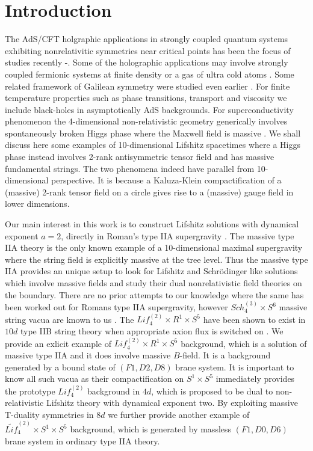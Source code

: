 \documentclass[12pt]{article}
\begin{document}
\section{Introduction}
The AdS/CFT  \cite{Maldacena:1997re,Gubser:1998bc, Witten:1998qj}
 holgraphic applications in strongly 
coupled quantum systems exhibiting nonrelativitic symmetries near critical points
 has been the focus of studies recently \cite{son}-\cite{taylor}.  
Some of the holographic applications may involve   strongly coupled fermionic 
systems at finite density or a gas of ultra cold atoms 
\cite{son, bala}. Some  related framework of Galilean symmetry were 
studied even earlier  \cite{horvathy}.  For 
finite temperature properties such as phase transitions, 
transport and viscosity we include black-holes in asymptotically 
AdS  backgrounds. For superconductivity phenomenon  the 4-dimensional
non-relativistic  geometry generically involves 
spontaneously broken Higgs phase where the  Maxwell field 
is massive \cite{herzogrev,denefrev}. We shall discuss here some 
examples of 10-dimensional Lifshitz spacetimes
 where a Higgs phase instead involves  2-rank 
antisymmetric tensor field and has massive fundamental strings. 
The two phenomena 
indeed have parallel from 10-dimensional perspective. It is because
a Kaluza-Klein compactification of a (massive) 2-rank tensor field
on a circle  gives rise to a (massive) gauge field in  lower dimensions.

Our main interest in this work is to construct Lifshitz  solutions with dynamical 
exponent $a=2$, directly in  Roman's  type IIA supergravity  \cite{roma}.
The massive type IIA theory is the only known example of a 
10-dimensional maximal supergravity where the string 
field is explicitly massive at the tree level. 
Thus the massive type IIA  provides an unique setup to look for Lifshitz  
and Schr\"odinger  like
 solutions which involve massive fields and study  their dual
nonrelativistic field theories on the boundary.
There are no prior
attempts to our knowledge where the same has been worked out for 
Romans type IIA supergravity, however $Sch_4^{(3)}\times S^6$ massive string
vacua are known to us \cite{Singh:2009tq}. 
The $Lif_4^{(2)}\times R^1\times S^5$ have been shown to exist 
in $10d$ type IIB
string theory when appropriate axion flux is switched 
on \cite{Balasubramanian:2010uk}. We provide an exlicit example of 
$Lif_4^{(2)}\times R^1\times  S^5$ background,
which is  a solution of massive type IIA and it does involve massive 
$B$-field. It is a background 
generated by a bound state of $(F1,D2,D8)$ brane system. 
It is important to know all such vacua
as their compactification  on $S^1\times S^5$ 
immediately provides the prototype  
$Lif_4^{(2)}$ background in $4d$,  which is proposed to 
be dual to non-relativistic Lifshitz  theory with dynamical exponent two. 
By exploiting massive T-duality symmetries in $8d$ we further 
provide another example of 
$\widetilde{Lif}_4^{(2)}\times S^1\times  S^5$ background, 
which is generated by massless
$(F1,D0,D6)$ brane system in ordinary type IIA theory. 
     
\end{document}
